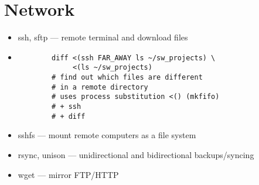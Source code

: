 \documentclass[%
        hyperref={%
                pdfauthor={Zakariyya Mughal},%
                pdfpagemode={None},pdfpagelayout={SinglePage}}%
        xcolor={x11names},%
]{beamer}
\begin{document}
\section{Network}\frame{\insertsection}
\begin{frame}[fragile]
	\begin{itemize}
\item ssh, sftp --- remote terminal and download files
\item \begin{lstlisting}
		diff <(ssh FAR_AWAY ls ~/sw_projects) \
		     <(ls ~/sw_projects)
		# find out which files are different
		# in a remote directory
		# uses process substitution <() (mkfifo)
		# + ssh
		# + diff
	\end{lstlisting}
\pause\item sshfs --- mount remote computers as a file system
\pause\item rsync, unison --- unidirectional and bidirectional backups/syncing
\pause\item wget --- mirror FTP/HTTP
	\end{itemize}
\end{frame}
\end{document}
